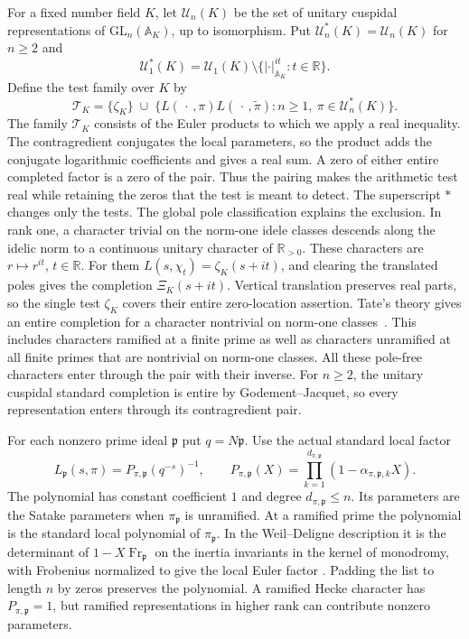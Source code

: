 \documentclass[11pt]{amsart}
\theoremstyle{definition}
\theoremstyle{remark}
\numberwithin{equation}{section}
\begin{document}
For a fixed number field \(K\), let \(\mathcal U_n(K)\) be the
set of unitary cuspidal representations of
\(\mathrm{GL}_n(\mathbb A_K)\), up to isomorphism. Put
\(\mathcal U_n^*(K)=\mathcal U_n(K)\) for \(n\geq2\) and
\[
 \mathcal U_1^*(K)=\mathcal U_1(K)\setminus
 \{|\cdot|_{\mathbb A_K}^{it}:t\in\mathbb R\}.
\]
Define the test family over \(K\) by
\[
 \mathcal T_K=\{\zeta_K\}\;\cup\;
 \{L(\,\cdot\,,\pi)L(\,\cdot\,,\widetilde\pi):
                  n\geq1,\ \pi\in\mathcal U_n^*(K)\}.
\]
The family \(\mathcal T_K\) consists of the Euler products
to which we apply a real inequality. The contragredient
conjugates the local parameters, so the product adds the
conjugate logarithmic coefficients and gives a real sum.
A zero of either entire completed factor is a zero of the
pair. Thus the pairing makes the arithmetic test real while
retaining the zeros that the test is meant to detect.
The superscript \(*\) changes only the tests. The global pole
classification explains the exclusion. In rank one, a character
trivial on the norm-one idele classes descends along the idelic
norm to a continuous unitary character of \(\mathbb R_{>0}\).
These characters are \(r\mapsto r^{it}\), \(t\in\mathbb R\).
For them \(L(s,\chi_t)=\zeta_K(s+it)\), and clearing the
translated poles gives the completion \(\Xi_K(s+it)\).
Vertical translation preserves real parts, so the single test
\(\zeta_K\) covers their entire zero-location assertion.
Tate's theory gives an entire completion for a character
nontrivial on norm-one classes~\cite{Tate1967}. This includes
characters ramified at a finite prime as well as characters
unramified at all finite primes that are nontrivial on norm-one
classes. All these pole-free characters enter through the pair
with their inverse. For \(n\ge2\), the unitary cuspidal
standard completion is entire by Godement--Jacquet, so every
representation enters through its contragredient pair.

For each nonzero prime ideal \(\mathfrak p\) put \(q=N\mathfrak p\).
Use the actual standard local factor
\[
 L_{\mathfrak p}(s,\pi)=P_{\pi,\mathfrak p}(q^{-s})^{-1},
 \qquad P_{\pi,\mathfrak p}(X)=\prod_{k=1}^{d_{\pi,\mathfrak p}}
                           (1-\alpha_{\pi,\mathfrak p,k}X).
\]
The polynomial has constant coefficient \(1\) and degree
\(d_{\pi,\mathfrak p}\leq n\). Its parameters are the Satake
parameters when \(\pi_{\mathfrak p}\) is unramified. At a ramified
prime the polynomial is the standard local polynomial of
\(\pi_{\mathfrak p}\). In the Weil--Deligne description it is the
determinant of \(1-X\operatorname{Fr}_{\mathfrak p}\) on the
inertia invariants in the kernel of monodromy, with Frobenius
normalized to give the local Euler factor
\cite[\S\,1]{BrumleyEffectiveMultiplicity}.
Padding the list to length \(n\) by zeros preserves the polynomial.
A ramified Hecke character has \(P_{\pi,\mathfrak p}=1\), but
ramified representations in higher rank can contribute nonzero
parameters.
\end{document}
